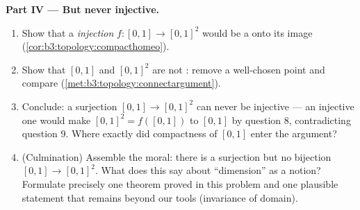 \begin{problem}
\medskip
\noindent\textbf{Part IV --- But never injective.}
\begin{enumerate}[resume]
  \item Show that a  \emph{injection} $f \colon [0,1]
        \to [0,1]^2$ would be a  onto its image
        (\cref{cor:b3:topology:compacthomeo}).
  \item Show that $[0,1]$ and $[0,1]^2$ are not :
        remove a well-chosen point and compare 
        (\cref{met:b3:topology:connectargument}).
  \item Conclude: a  surjection $[0,1] \to [0,1]^2$
        can never be injective --- an injective one would make
        $[0,1]^2 = f([0,1])$  to $[0,1]$ by
        question 8, contradicting question 9. Where exactly did
        compactness of $[0,1]$ enter the argument?
  \item (Culmination) Assemble the moral: there is a 
        surjection but no  bijection $[0,1] \to
        [0,1]^2$. What does this say about ``dimension'' as a
         notion? Formulate precisely one theorem
        proved in this problem and one plausible statement that
        remains beyond our tools (invariance of domain).
\end{enumerate}


\end{problem}
